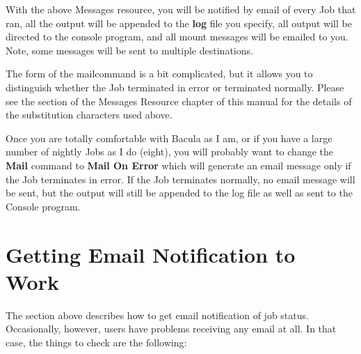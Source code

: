 With the above Messages resource, you will be notified by email of every Job
that ran, all the output will be appended to the {\bf log} file you specify,
all output will be directed to the console program, and all mount messages
will be emailed to you. Note, some messages will be sent to multiple
destinations. 

The form of the mailcommand is a bit complicated, but it allows you to
distinguish whether the Job terminated in error or terminated normally. Please
see the 
 section of the Messages
Resource chapter of this manual for the details of the substitution characters
used above. 

Once you are totally comfortable with Bacula as I am, or if you have a large
number of nightly Jobs as I do (eight), you will probably want to change the
{\bf Mail} command to {\bf Mail On Error} which will generate an email message
only if the Job terminates in error. If the Job terminates normally, no email
message will be sent, but the output will still be appended to the log file as
well as sent to the Console program. 

\section{Getting Email Notification to Work}
\label{email}

The section above describes how to get email notification of job status.
Occasionally, however, users have problems receiving any email at all. In that
case, the things to check are the following: 

